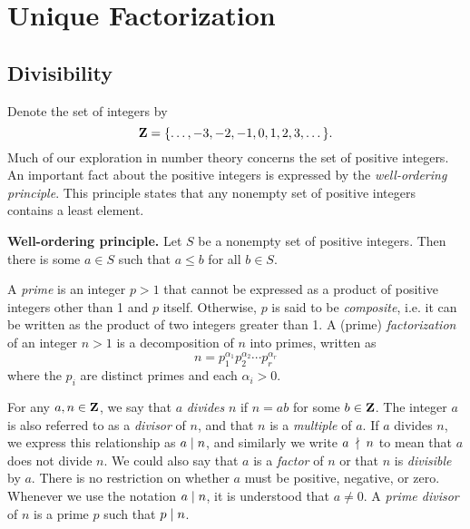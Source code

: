 
\chapter{Unique Factorization}



\section{Divisibility}

Denote the set of integers by\index{$\ZZ$}
\[
\mathbf{Z}
=
\{\dots, -3, -2, -1, 0, 1, 2, 3, \dots\}.
\]
Much of our exploration in number theory concerns the set of positive
integers. An important fact about the positive integers is expressed
by the
\emph{well-ordering principle}. This
principle states that any nonempty set of positive integers
contains a least element.

\begin{theorem}
\label{thm:unique_factorization:well_ordering_principle}
\textbf{Well-ordering principle.}
Let $S$ be a nonempty set of positive integers. Then there is some
$a \in S$ such that $a \leq b$ for all $b \in S$.
\end{theorem}

A \emph{prime} is an integer $p > 1$ that cannot be
expressed as a product of positive integers other than 1 and $p$
itself. Otherwise, $p$ is said to be
\emph{composite}, i.e. it can be written as the
product of two integers greater than 1. A (prime)
\emph{factorization} of an integer $n > 1$ is a
decomposition of $n$ into primes, written as
\[
n
=
p_1^{\alpha_1} p_2^{\alpha_2} \cdots p_r^{\alpha_r}
\]
where the $p_i$ are distinct primes and each $\alpha_i > 0$.

For any $a,n \in \mathbf{Z}$, we say that $a$ \emph{divides}
$n$ if $n = ab$ for some $b \in \mathbf{Z}$. The integer $a$ is also referred
to as a \emph{divisor} of $n$, and that $n$ is a
\emph{multiple} of $a$. If $a$ divides $n$, we
express this relationship as $a \;|\; n$\index{$\divides$}, and
similarly we write $a \;\nmid\; n$\index{$\notdivides$} to mean that
$a$ does not divide $n$. We could also say that $a$ is a
\emph{factor} of $n$ or that $n$ is
\emph{divisible} by $a$. There is no restriction on
whether $a$ must be positive, negative, or zero. Whenever we use the
notation $a \;|\; n$, it is understood that $a \neq 0$. A
\emph{prime divisor} of $n$ is a prime $p$ such
that $p \;|\; n$.

